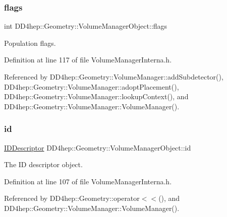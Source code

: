 \subsubsection{\texorpdfstring{flags}{flags}}
{\footnotesize\ttfamily int D\+D4hep\+::\+Geometry\+::\+Volume\+Manager\+Object\+::flags}



Population flags. 



Definition at line 117 of file Volume\+Manager\+Interna.\+h.



Referenced by D\+D4hep\+::\+Geometry\+::\+Volume\+Manager\+::add\+Subdetector(), D\+D4hep\+::\+Geometry\+::\+Volume\+Manager\+::adopt\+Placement(), D\+D4hep\+::\+Geometry\+::\+Volume\+Manager\+::lookup\+Context(), and D\+D4hep\+::\+Geometry\+::\+Volume\+Manager\+::\+Volume\+Manager().

\hypertarget{class_d_d4hep_1_1_geometry_1_1_volume_manager_object_a34cf251ba79ecddf50f9fdaf50265968}{}\label{class_d_d4hep_1_1_geometry_1_1_volume_manager_object_a34cf251ba79ecddf50f9fdaf50265968} 
\subsubsection{\texorpdfstring{id}{id}}
{\footnotesize\ttfamily \hyperlink{class_d_d4hep_1_1_geometry_1_1_i_d_descriptor}{I\+D\+Descriptor} D\+D4hep\+::\+Geometry\+::\+Volume\+Manager\+Object\+::id}



The ID descriptor object. 



Definition at line 107 of file Volume\+Manager\+Interna.\+h.



Referenced by D\+D4hep\+::\+Geometry\+::operator$<$$<$(), and D\+D4hep\+::\+Geometry\+::\+Volume\+Manager\+::\+Volume\+Manager().

\hypertarget{class_d_d4hep_1_1_geometry_1_1_volume_manager_object_aff0c698fcc27fa3778734a5c5bd6074f}{}\label{class_d_d4hep_1_1_geometry_1_1_volume_manager_object_aff0c698fcc27fa3778734a5c5bd6074f} 
